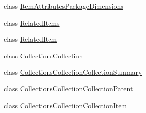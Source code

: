 \begin{DoxyCompactItemize}
\begin{DoxyCompactList}\small\item\em \end{DoxyCompactList}\item 
class \hyperlink{class_amazon___price___finder_1_1amazon_1_1ecs_1_1_item_attributes_package_dimensions}{Item\-Attributes\-Package\-Dimensions}
\begin{DoxyCompactList}\small\item\em \end{DoxyCompactList}\item 
class \hyperlink{class_amazon___price___finder_1_1amazon_1_1ecs_1_1_related_items}{Related\-Items}
\begin{DoxyCompactList}\small\item\em \end{DoxyCompactList}\item 
class \hyperlink{class_amazon___price___finder_1_1amazon_1_1ecs_1_1_related_item}{Related\-Item}
\begin{DoxyCompactList}\small\item\em \end{DoxyCompactList}\item 
class \hyperlink{class_amazon___price___finder_1_1amazon_1_1ecs_1_1_collections_collection}{Collections\-Collection}
\begin{DoxyCompactList}\small\item\em \end{DoxyCompactList}\item 
class \hyperlink{class_amazon___price___finder_1_1amazon_1_1ecs_1_1_collections_collection_collection_summary}{Collections\-Collection\-Collection\-Summary}
\begin{DoxyCompactList}\small\item\em \end{DoxyCompactList}\item 
class \hyperlink{class_amazon___price___finder_1_1amazon_1_1ecs_1_1_collections_collection_collection_parent}{Collections\-Collection\-Collection\-Parent}
\begin{DoxyCompactList}\small\item\em \end{DoxyCompactList}\item 
class \hyperlink{class_amazon___price___finder_1_1amazon_1_1ecs_1_1_collections_collection_collection_item}{Collections\-Collection\-Collection\-Item}
\begin{DoxyCompactList}\small\item\em \end{DoxyCompactList}\item 

\end{DoxyCompactItemize}
